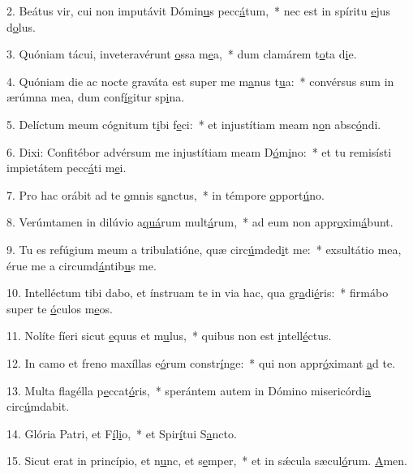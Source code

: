 2. Beátus vir, cui non imputávit Dómin\uline{u}s pecc\uline{á}tum,~* nec est in spíritu \uline{e}jus d\uline{o}lus.\par 
3. Quóniam tácui, inveteravérunt \uline{o}ssa m\uline{e}a,~* dum clamárem t\uline{o}ta d\uline{i}e.\par 
4. Quóniam die ac nocte graváta est super me m\uline{a}nus t\uline{u}a:~* convérsus sum in ærúmna mea, dum conf\uline{í}gitur sp\uline{i}na.\par 
5. Delíctum meum cógnitum t\uline{i}bi f\uline{e}ci:~* et injustítiam meam n\uline{o}n absc\uline{ó}ndi.\par 
6. Dixi: Confitébor advérsum me injustítiam meam D\uline{ó}m\uline{i}no:~* et tu remisísti impietátem pecc\uline{á}ti m\uline{e}i.\par 
7. Pro hac orábit ad te \uline{o}mnis s\uline{a}nctus,~* in témpore \uline{o}pport\uline{ú}no.\par 
8. Verúmtamen in dilúvio a\uline{quá}rum mult\uline{á}rum,~* ad eum non appr\uline{o}xim\uline{á}bunt.\par 
9. Tu es refúgium meum a tribulatióne, quæ circ\uline{ú}mded\uline{i}t me:~* exsultátio mea, érue me a circumd\uline{á}ntib\uline{u}s me.\par 
10. Intelléctum tibi dabo, et ínstruam te in via hac, qua gr\uline{a}di\uline{é}ris:~* firmábo super te \uline{ó}culos m\uline{e}os.\par 
11. Nolíte fíeri sicut \uline{e}quus et m\uline{u}lus,~* quibus non est \uline{i}ntell\uline{é}ctus.\par 
12. In camo et freno maxíllas e\uline{ó}rum constr\uline{í}nge:~* qui non appr\uline{ó}ximant \uline{a}d te.\par 
13. Multa flagélla p\uline{e}ccat\uline{ó}ris,~* sperántem autem in Dómino misericórdi\uline{a} circ\uline{ú}mdabit.\par 
14. Glória Patri, et F\uline{í}l\uline{i}o,~* et Spir\uline{í}tui S\uline{a}ncto.\par 
15. Sicut erat in princípio, et n\uline{u}nc, et s\uline{e}mper,~* et in sǽcula sæcul\uline{ó}rum. \uline{A}men.\par 
